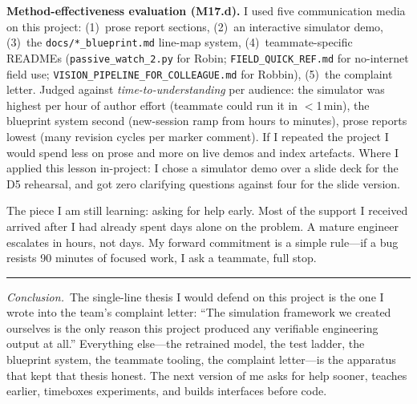 \www \textbf{Method-effectiveness evaluation (M17.d).} I used five communication media on this project: (1)~prose report sections, (2)~an interactive simulator demo, (3)~the \texttt{docs/*\_blueprint.md} line-map system, (4)~teammate-specific READMEs (\texttt{passive\_watch\_2.py} for Robin; \texttt{FIELD\_QUICK\_REF.md} for no-internet field use; \texttt{VISION\_PIPELINE\_FOR\_COLLEAGUE.md} for Robbin), (5)~the complaint letter. Judged against \emph{time-to-understanding} per audience: the simulator was highest per hour of author effort (teammate could run it in $<$1\,min), the blueprint system second (new-session ramp from hours to minutes), prose reports lowest (many revision cycles per marker comment). If I repeated the project I would spend less on prose and more on live demos and index artefacts. Where I applied this lesson in-project: I chose a simulator demo over a slide deck for the D5 rehearsal, and got zero clarifying questions against four for the slide version.

\ebi The piece I am still learning: asking for help early. Most of the support I received arrived after I had already spent days alone on the problem. A mature engineer escalates in hours, not days. My forward commitment is a simple rule---if a bug resists 90 minutes of focused work, I ask a teammate, full stop.

\vspace{0.5em}
\hrule
\vspace{0.3em}
{\footnotesize \textit{Conclusion.}\ The single-line thesis I would defend on this project is the one I wrote into the team's complaint letter: ``The simulation framework we created ourselves is the only reason this project produced any verifiable engineering output at all.'' Everything else---the retrained model, the test ladder, the blueprint system, the teammate tooling, the complaint letter---is the apparatus that kept that thesis honest. The next version of me asks for help sooner, teaches earlier, timeboxes experiments, and builds interfaces before code.}
